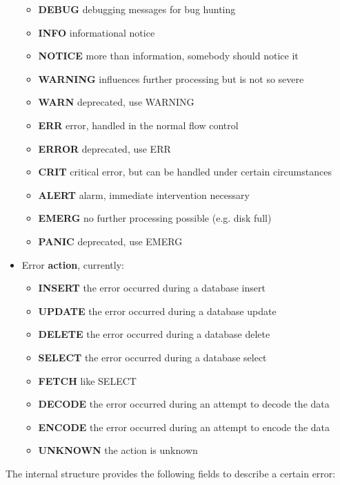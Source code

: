 \begin{itemize}
\begin{itemize}
\item \textbf{DEBUG}   debugging messages for bug hunting
\item \textbf{INFO}    informational notice
\item \textbf{NOTICE}  more than information, somebody should notice it
\item \textbf{WARNING} influences further processing but is not so severe
\item \textbf{WARN}    deprecated, use WARNING
\item \textbf{ERR}     error, handled in the normal flow control
\item \textbf{ERROR}   deprecated, use ERR
\item \textbf{CRIT}    critical error, but can be handled under certain circumstances
\item \textbf{ALERT}   alarm, immediate intervention necessary
\item \textbf{EMERG}   no further processing possible (e.g. disk full)
\item \textbf{PANIC}   deprecated, use EMERG\end{itemize}

\item Error \textbf{action}, currently:\begin{itemize}

\item \textbf{INSERT}  the error occurred during a database insert
\item \textbf{UPDATE}  the error occurred during a database update
\item \textbf{DELETE}  the error occurred during a database delete
\item \textbf{SELECT}  the error occurred during a database select
\item \textbf{FETCH}   like SELECT
\item \textbf{DECODE}  the error occurred during an attempt to decode the data
\item \textbf{ENCODE}  the error occurred during an attempt to encode the data
\item \textbf{UNKNOWN} the action is unknown\end{itemize}
\end{itemize}


The internal structure provides the following fields to describe a
certain error:

